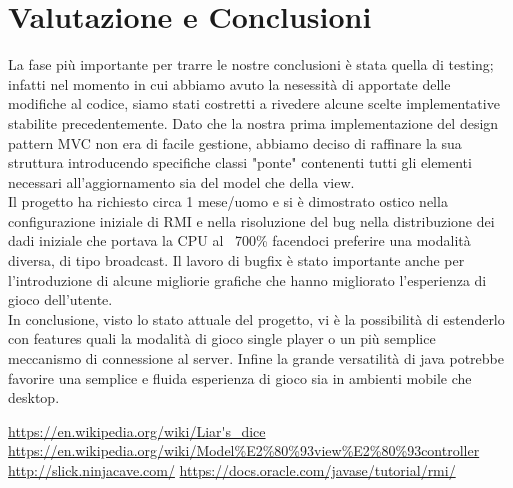 \documentclass{llncs}
\begin{document}


	
	\section{Valutazione e Conclusioni}%
		La fase più importante per trarre le nostre conclusioni è stata quella di testing; infatti nel momento in cui abbiamo avuto la nesessità di apportate delle modifiche al codice, siamo stati costretti a rivedere alcune scelte implementative stabilite precedentemente. Dato che la nostra prima implementazione del design pattern MVC non era di facile gestione, abbiamo deciso di raffinare la sua struttura introducendo specifiche classi "ponte" contenenti tutti gli elementi necessari all'aggiornamento sia del model che della view. \\
		Il progetto ha richiesto circa 1 mese/uomo e si è dimostrato ostico nella configurazione iniziale di RMI e nella risoluzione del bug nella distribuzione dei dadi iniziale che portava la CPU al ~700\% facendoci preferire una modalità diversa, di tipo broadcast.
		Il lavoro di bugfix è stato importante anche per l'introduzione di alcune migliorie grafiche che hanno migliorato l'esperienza di gioco dell'utente. \\
		In conclusione, visto lo stato attuale del progetto, vi è la possibilità di estenderlo con features quali la modalità di gioco single player o un più semplice meccanismo di connessione al server. Infine la grande versatilità di java potrebbe favorire una semplice e fluida esperienza di gioco sia in ambienti mobile che desktop.
	

	\begin{thebibliography}{}
		 \url{https://en.wikipedia.org/wiki/Liar's\_dice}
		 \url{https://en.wikipedia.org/wiki/Model%E2%80%93view%E2%80%93controller}
		 \url{http://slick.ninjacave.com/}
		 \url{https://docs.oracle.com/javase/tutorial/rmi/}
	\end{thebibliography}
\end{document}
